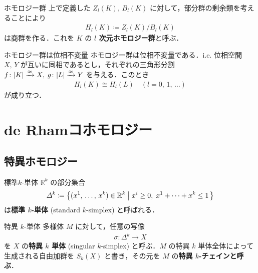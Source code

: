\documentclass[geometry_main]{subfiles}
\begin{document}
\begin{mydef}[label=HomologyGroup]{ホモロジー群}
	上で定義した $Z_l(K),\, B_l(K)$ に対して，部分群の剰余類を考えることにより
	\begin{align} 
		H_l(K) \coloneqq Z_l(K) / B_l(K)
	\end{align}
	は商群を作る．これを $K$ の\textbf{ $l$ 次元ホモロジー群}と呼ぶ．
\end{mydef}


\begin{mytheo}[label=thm:simplicial-topo]{ホモロジー群は位相不変量}
	ホモロジー群は位相不変量である．i.e. 位相空間 $X,\, Y$ が互いに同相であるとし，それぞれの三角形分割 $f \colon \abs{K} \xrightarrow{\approx} X,\; g \colon \abs{L} \xrightarrow{\approx} Y$ を与える．このとき
	\begin{align}
		H_l (K) \cong H_l(L)\quad (l = 0,\, 1,\, \dots)
	\end{align}
	が成り立つ．
\end{mytheo}


\section{de Rhamコホモロジー}

\subsection{特異ホモロジー}

\begin{mydef}[label=stdsimplex]{標準$k$-単体}
	$\mathbb{R}^k$ の部分集合
	\begin{align} 
		\varDelta^k \coloneqq \bigl\{ (x^1,\, \dots ,\, x^k) \in \mathbb{R}^k \bigm| x^i \ge 0, \; x^1 + \cdots + x^k \le 1\, \bigr\} 
	\end{align}
	は\textbf{標準 $k$-単体} (standard $k$-simplex) と呼ばれる．
\end{mydef}

\begin{mydef}[label=sg_k-simplez]{\cinfty 特異 $k$-単体} 
	\cinfty 多様体 $M$ に対して，任意の\cinfty 写像
	\begin{align} 
		\sigma \colon \varDelta^k \to X
	\end{align}
	を $X$ の\textbf{\cinfty 特異 $k$ 単体} (singular $k$-simplex) と呼ぶ．$M$ の\cinfty 特異 $k$ 単体全体によって生成される自由加群を $S_k(X)$ と書き，その元を $M$ の\textbf{\cinfty 特異 $k$-チェインと呼ぶ}．
\end{mydef}
\end{document}
